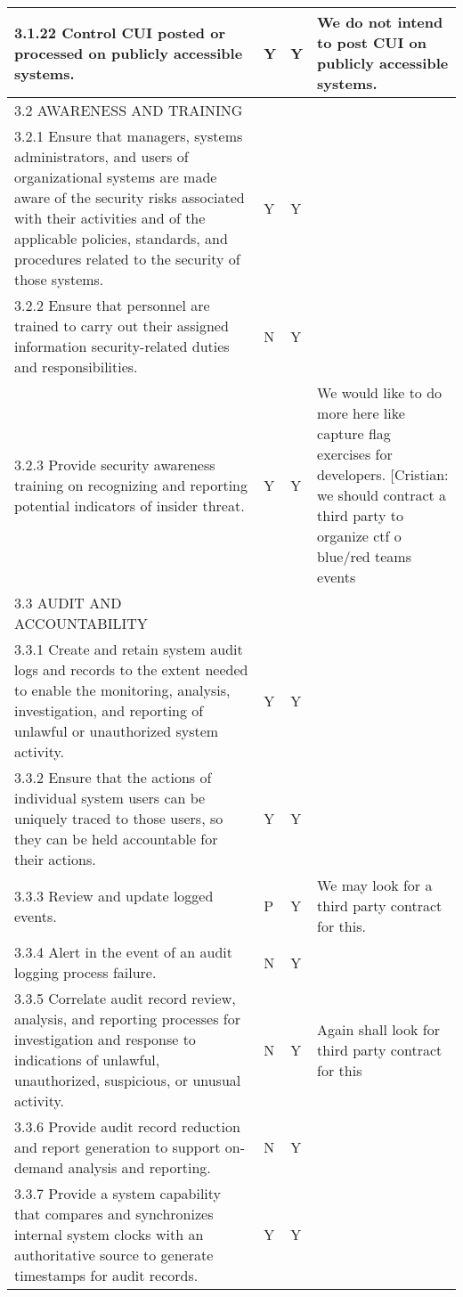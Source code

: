 \begin{longtable} {|p{}|p{}|p{}|p{} |}
{3.1.22 Control CUI posted or processed on publicly accessible systems.}&{Y}&{Y}&{We do not intend to post CUI on publicly accessible systems. } \\ \hline
{3.2 AWARENESS AND TRAINING}&&& \\ \hline
{3.2.1 Ensure that managers, systems administrators, and users of organizational systems are made aware of the security risks associated with their activities and of the applicable policies, standards, and procedures related to the security of those systems.}&{Y}&{Y}& \\ \hline
{3.2.2 Ensure that personnel are trained to carry out their assigned information security-related duties and responsibilities.}&{N}&{Y}& \\ \hline
{3.2.3 Provide security awareness training on recognizing and reporting potential indicators of insider threat.}&{Y}&{Y}&{We would like to do more here like capture flag exercises for developers. [Cristian: we should contract a third party to organize ctf o blue/red teams events} \\ \hline
{3.3 AUDIT AND ACCOUNTABILITY}&&& \\ \hline
{3.3.1 Create and retain system audit logs and records to the extent needed to enable the monitoring, analysis, investigation, and reporting of unlawful or unauthorized system activity.}&{Y}&{Y}& \\ \hline
{3.3.2 Ensure that the actions of individual system users can be uniquely traced to those users, so they can be held accountable for their actions.}&{Y}&{Y}& \\ \hline
{3.3.3 Review and update logged events.}&{P}&{Y}&{We may look for a third party contract for this.} \\ \hline
{3.3.4 Alert in the event of an audit logging process failure.}&{N}&{Y}& \\ \hline
{3.3.5 Correlate audit record review, analysis, and reporting processes for investigation and response to indications of unlawful, unauthorized, suspicious, or unusual activity.}&{N}&{Y}&{Again shall look for third party contract for this} \\ \hline
{3.3.6 Provide audit record reduction and report generation to support on-demand analysis and reporting.}&{N}&{Y}& \\ \hline
{3.3.7 Provide a system capability that compares and synchronizes internal system clocks with an authoritative source to generate timestamps for audit records.}&{Y}&{Y}& \\ \hline

\end{longtable}
